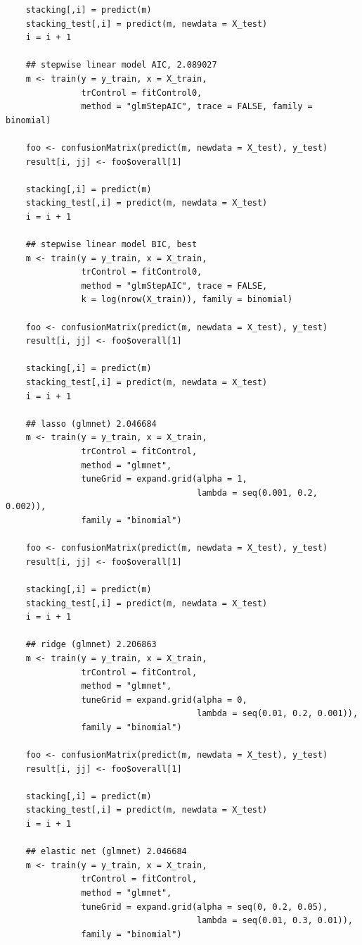 \documentclass[11pt,oneside,a4paper]{article}
\begin{document}
\begin{verbatim}
    stacking[,i] = predict(m)
    stacking_test[,i] = predict(m, newdata = X_test)
    i = i + 1
    
    ## stepwise linear model AIC, 2.089027
    m <- train(y = y_train, x = X_train,
               trControl = fitControl0,
               method = "glmStepAIC", trace = FALSE, family = binomial)

    foo <- confusionMatrix(predict(m, newdata = X_test), y_test)
    result[i, jj] <- foo$overall[1]
    
    stacking[,i] = predict(m)
    stacking_test[,i] = predict(m, newdata = X_test)
    i = i + 1
    
    ## stepwise linear model BIC, best
    m <- train(y = y_train, x = X_train,
               trControl = fitControl0,
               method = "glmStepAIC", trace = FALSE, 
               k = log(nrow(X_train)), family = binomial)

    foo <- confusionMatrix(predict(m, newdata = X_test), y_test)
    result[i, jj] <- foo$overall[1]
    
    stacking[,i] = predict(m)
    stacking_test[,i] = predict(m, newdata = X_test)
    i = i + 1
    
    ## lasso (glmnet) 2.046684
    m <- train(y = y_train, x = X_train,
               trControl = fitControl,
               method = "glmnet", 
               tuneGrid = expand.grid(alpha = 1, 
                                      lambda = seq(0.001, 0.2, 0.002)), 
               family = "binomial")

    foo <- confusionMatrix(predict(m, newdata = X_test), y_test)
    result[i, jj] <- foo$overall[1]
    
    stacking[,i] = predict(m)
    stacking_test[,i] = predict(m, newdata = X_test)
    i = i + 1
    
    ## ridge (glmnet) 2.206863
    m <- train(y = y_train, x = X_train,
               trControl = fitControl,
               method = "glmnet", 
               tuneGrid = expand.grid(alpha = 0, 
                                      lambda = seq(0.01, 0.2, 0.001)), 
               family = "binomial")

    foo <- confusionMatrix(predict(m, newdata = X_test), y_test)
    result[i, jj] <- foo$overall[1]
    
    stacking[,i] = predict(m)
    stacking_test[,i] = predict(m, newdata = X_test)
    i = i + 1
    
    ## elastic net (glmnet) 2.046684
    m <- train(y = y_train, x = X_train,
               trControl = fitControl,
               method = "glmnet", 
               tuneGrid = expand.grid(alpha = seq(0, 0.2, 0.05), 
                                      lambda = seq(0.01, 0.3, 0.01)), 
               family = "binomial")
    

\end{verbatim}
\end{document}
